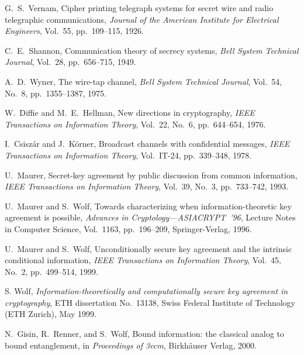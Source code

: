 \documentclass[a4paper, twoside, openany]{report}
\theoremstyle{plain}
\theoremstyle{definition}
\begin{document}
\begin{thebibliography}{99}


G.~S.~Vernam, Cipher printing telegraph systems for secret wire and 
radio telegraphic communications, {\em Journal of the American
Institute for Electrical Engineers}, Vol.~55, pp.~109--115, 1926.

C.~E.~Shannon, Communication theory of secrecy systems,
{\em Bell System Technical Journal}, Vol.~28, pp.~656--715, 1949.

A.~D.~Wyner, The wire-tap channel,
{\em Bell System Technical Journal}, Vol.~54, No.~8, pp.~1355--1387, 1975.

 W.~Diffie and M.~E.~Hellman, New directions in
cryptography, {\em IEEE Transactions on Information Theory}, 
Vol.~22, No.~6, pp.~644--654, 1976.

 I.~Csisz\'{a}r and J.~K\"orner, 
Broadcast channels with confidential messages, 
{\em IEEE Transactions on Information Theory\/}, 
Vol.~IT-24, pp.~339--348, 1978.

 U.~Maurer, Secret-key agreement by public discussion from
common information, {\em IEEE Transactions on Information Theory\/},
Vol.~39, No.~3, pp.~733--742, 1993.

 U.~Maurer and S.~Wolf, Towards characterizing when information-theoretic key agreement is possible, \emph{Advances in Cryptology---ASIACRYPT~'96}, Lecture Notes in Computer Science, Vol.~1163, pp.~196--209, Springer-Verlag, 1996.

U.~Maurer and S.~Wolf, Unconditionally secure key agreement 
and the intrinsic conditional information, 
{\em IEEE Transactions on Information Theory\/}, 
Vol.~45, No.~2, pp.~499--514, 1999.

 S. Wolf, {\em Information-theoretically and computationally
secure key agreement in cryptography}, ETH dissertation No.\ 13138, 
Swiss Federal Institute of Technology (ETH Zurich), May 1999.

N.\ Gisin, R.\ Renner, and S.\ Wolf,
Bound information: the classical analog to bound entanglement,
in {\em Proceedings of 3ecm}, Birkh\"auser Verlag, 2000.

\end{thebibliography}


\end{document}

